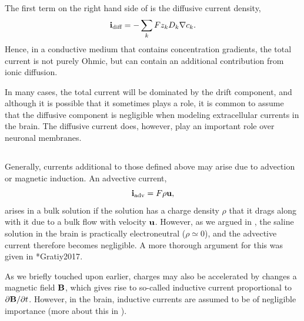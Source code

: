 The first term on the right hand side of  is the diffusive current density,
\begin{equation}
{\bf i}_\text{diff}  = -\sum_k{F z_k {D_k}{\bf \nabla} c_{k}}.
\label{eq:Basics:idiff}
\end{equation}
Hence, in a conductive medium that contains concentration gradients, the total current is not purely Ohmic, but can contain an additional contribution from ionic diffusion. 

In many cases, the total current will be dominated by the drift component, and although it is possible that it sometimes plays a role, it is common to assume that the diffusive component is negligible when modeling extracellular currents in the brain. The diffusive current does, however, play an important role over neuronal membranes.


\subsection{}
Generally, currents additional to those defined above may arise due to advection or magnetic induction. An advective current,
\begin{equation}
{\bf i}_\text{adv} = F \rho {\bf u},
\label{VC:eq:iadv}
\end{equation}
arises in a bulk solution if the solution has a charge density $\rho$ that it drags along with it due to a bulk flow with velocity ${\bf u}$. However, as we argued in , the saline solution in the brain is practically electroneutral ($\rho \simeq 0$), and the advective current therefore becomes negligible. A more thorough argument for this was given in \citeasnoun**{Gratiy2017}.

As we briefly touched upon earlier, charges may also be accelerated by changes a magnetic field ${\bf B}$, which gives rise to so-called inductive current proportional to $\partial {\bf B}/\partial t$. However, in the brain, inductive currents are assumed to be of negligible importance (more about this in ).



